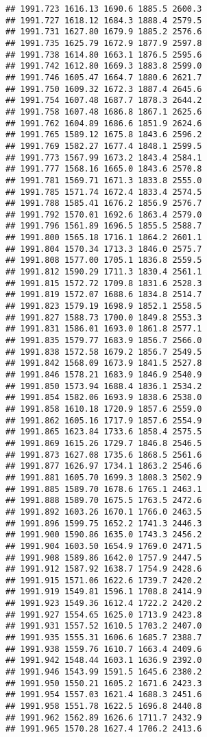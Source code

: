 \documentclass[
]{article}
\begin{document}
\begin{verbatim}
## 1991.723 1616.13 1690.6 1885.5 2600.3
## 1991.727 1618.12 1684.3 1888.4 2579.5
## 1991.731 1627.80 1679.9 1885.2 2576.6
## 1991.735 1625.79 1672.9 1877.9 2597.8
## 1991.738 1614.80 1663.1 1876.5 2595.6
## 1991.742 1612.80 1669.3 1883.8 2599.0
## 1991.746 1605.47 1664.7 1880.6 2621.7
## 1991.750 1609.32 1672.3 1887.4 2645.6
## 1991.754 1607.48 1687.7 1878.3 2644.2
## 1991.758 1607.48 1686.8 1867.1 2625.6
## 1991.762 1604.89 1686.6 1851.9 2624.6
## 1991.765 1589.12 1675.8 1843.6 2596.2
## 1991.769 1582.27 1677.4 1848.1 2599.5
## 1991.773 1567.99 1673.2 1843.4 2584.1
## 1991.777 1568.16 1665.0 1843.6 2570.8
## 1991.781 1569.71 1671.3 1833.8 2555.0
## 1991.785 1571.74 1672.4 1833.4 2574.5
## 1991.788 1585.41 1676.2 1856.9 2576.7
## 1991.792 1570.01 1692.6 1863.4 2579.0
## 1991.796 1561.89 1696.5 1855.5 2588.7
## 1991.800 1565.18 1716.1 1864.2 2601.1
## 1991.804 1570.34 1713.3 1846.0 2575.7
## 1991.808 1577.00 1705.1 1836.8 2559.5
## 1991.812 1590.29 1711.3 1830.4 2561.1
## 1991.815 1572.72 1709.8 1831.6 2528.3
## 1991.819 1572.07 1688.6 1834.8 2514.7
## 1991.823 1579.19 1698.9 1852.1 2558.5
## 1991.827 1588.73 1700.0 1849.8 2553.3
## 1991.831 1586.01 1693.0 1861.8 2577.1
## 1991.835 1579.77 1683.9 1856.7 2566.0
## 1991.838 1572.58 1679.2 1856.7 2549.5
## 1991.842 1568.09 1673.9 1841.5 2527.8
## 1991.846 1578.21 1683.9 1846.9 2540.9
## 1991.850 1573.94 1688.4 1836.1 2534.2
## 1991.854 1582.06 1693.9 1838.6 2538.0
## 1991.858 1610.18 1720.9 1857.6 2559.0
## 1991.862 1605.16 1717.9 1857.6 2554.9
## 1991.865 1623.84 1733.6 1858.4 2575.5
## 1991.869 1615.26 1729.7 1846.8 2546.5
## 1991.873 1627.08 1735.6 1868.5 2561.6
## 1991.877 1626.97 1734.1 1863.2 2546.6
## 1991.881 1605.70 1699.3 1808.3 2502.9
## 1991.885 1589.70 1678.6 1765.1 2463.1
## 1991.888 1589.70 1675.5 1763.5 2472.6
## 1991.892 1603.26 1670.1 1766.0 2463.5
## 1991.896 1599.75 1652.2 1741.3 2446.3
## 1991.900 1590.86 1635.0 1743.3 2456.2
## 1991.904 1603.50 1654.9 1769.0 2471.5
## 1991.908 1589.86 1642.0 1757.9 2447.5
## 1991.912 1587.92 1638.7 1754.9 2428.6
## 1991.915 1571.06 1622.6 1739.7 2420.2
## 1991.919 1549.81 1596.1 1708.8 2414.9
## 1991.923 1549.36 1612.4 1722.2 2420.2
## 1991.927 1554.65 1625.0 1713.9 2423.8
## 1991.931 1557.52 1610.5 1703.2 2407.0
## 1991.935 1555.31 1606.6 1685.7 2388.7
## 1991.938 1559.76 1610.7 1663.4 2409.6
## 1991.942 1548.44 1603.1 1636.9 2392.0
## 1991.946 1543.99 1591.5 1645.6 2380.2
## 1991.950 1550.21 1605.2 1671.6 2423.3
## 1991.954 1557.03 1621.4 1688.3 2451.6
## 1991.958 1551.78 1622.5 1696.8 2440.8
## 1991.962 1562.89 1626.6 1711.7 2432.9
## 1991.965 1570.28 1627.4 1706.2 2413.6

\end{verbatim}
\end{document}
